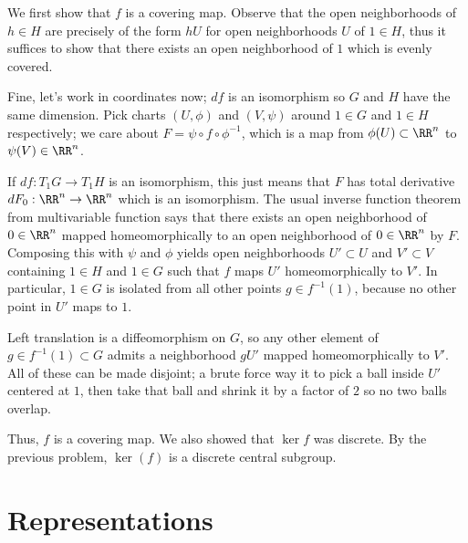 \documentclass[11pt, headheight=30pt]{scrartcl}
\begin{document}
We first show that $f$ is a covering map. Observe that the open neighborhoods
of $h\in H$ are precisely of the form $hU$ for open neighborhoods $U$ of $1\in H$,
thus it suffices to show that there exists an open neighborhood of $1$
which is evenly covered.

Fine, let's work in coordinates now; $df$ is an isomorphism so $G$ and $H$
have the same dimension. Pick charts $(U, \phi)$ and $(V,\psi)$
around $1\in G$ and $1\in H$ respectively; we care about
$F = \psi\circ f\circ \phi^{-1}$, which is a map from $\phi(U)\subset \RR^n$
to $\psi(V)\in \RR^n$.

If $df: T_1G\to T_1H$ is an isomorphism, this just means that $F$
has total derivative $dF_0: \RR^n \to \RR^n$ which is an isomorphism.
The usual inverse function theorem from multivariable function
says that there exists an open neighborhood of $0\in \RR^n$
mapped homeomorphically to an open neighborhood of $0\in \RR^n$
by $F$. Composing this with $\psi$ and $\phi$ yields open neighborhoods
$U'\subset U$ and $V'\subset V$ containing $1\in H$ and $1\in G$
such that $f$ maps $U'$ homeomorphically to $V'$. In particular, $1\in G$
is isolated from all other points $g\in f^{-1}(1)$, because no other
point in $U'$ maps to $1$.

Left translation is a diffeomorphism on $G$, so any other element
of $g\in f^{-1}(1)\subset G$ admits a neighborhood $gU'$ mapped
homeomorphically to $V'$. All of these can be made disjoint; a brute
force way it to pick a ball inside $U'$ centered at $1$, then take
that ball and shrink it by a factor of $2$ so no two balls overlap.

Thus, $f$ is a covering map. We also showed that $\ker f$
was discrete. By the previous problem, $\ker(f)$ is
a discrete central subgroup.

\section{Representations}
\end{document}
